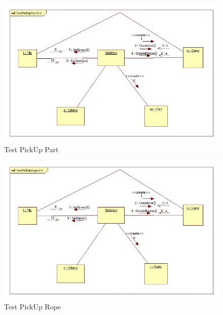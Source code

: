 \begin{figure}[H]
	\begin{center}
		\includegraphics[width=17cm]{chapters/chapter05/diagrams/TestPickUpPartInit.jpg}
		\caption{Test PickUp Part}
		\label{fig:Test PickUp Part}
	\end{center}
\end{figure}

\begin{figure}[H]
	\begin{center}
		\includegraphics[width=17cm]{chapters/chapter05/diagrams/TestPickUpRopeInit.jpg}
		\caption{Test PickUp Rope}
		\label{fig:Test PickUp Rope}
	\end{center}
\end{figure}

